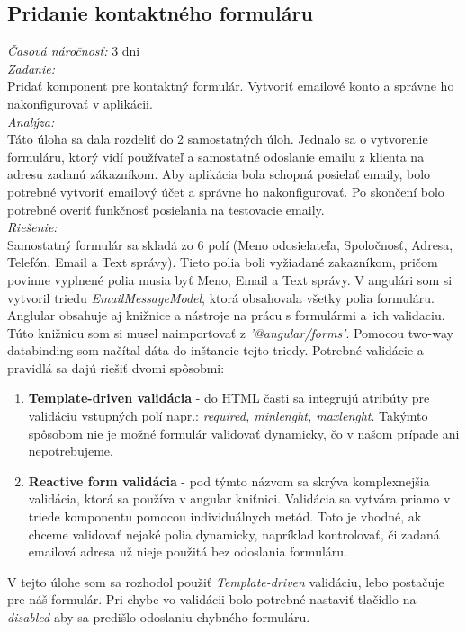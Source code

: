 \documentclass[11pt, oneside]{report}
\begin{document}
\subsection{Pridanie kontaktného formuláru }
\textit{Časová náročnosť:} 3 dni\\
\textit{Zadanie:}\\
Pridať komponent pre kontaktný formulár. Vytvoriť emailové konto a správne ho nakonfigurovať v aplikácii.
\\\textit{Analýza:}\\
Táto úloha sa dala rozdeliť do 2 samostatných úloh. Jednalo sa o vytvorenie formuláru, ktorý vidí používateľ a samostatné odoslanie emailu z klienta na adresu zadanú zákazníkom. Aby aplikácia bola schopná posielať emaily, bolo potrebné vytvoriť emailový účet a správne ho nakonfigurovať. Po skončení bolo potrebné overiť funkčnosť posielania na testovacie emaily.
\\\textit{Riešenie:}\\
Samostatný formulár sa skladá zo 6 polí (Meno odosielateľa, Spoločnosť, Adresa, Telefón, Email a Text správy). Tieto polia boli vyžiadané zakazníkom, pričom povinne vyplnené polia musia byť Meno, Email a Text správy. V angulári som si vytvoril triedu \textit{EmailMessageModel}, ktorá obsahovala všetky polia formuláru. Anglular obsahuje aj knižnice a nástroje na prácu s formulármi a~ich validaciu. Túto knižnicu som si musel naimportovať z  \textit{'@angular/forms'}. Pomocou two-way databinding som načítal dáta  do inštancie tejto triedy. Potrebné validácie a pravidlá sa dajú riešiť dvomi spôsobmi:
\begin{enumerate}
\item\textbf{Template-driven validácia} - do HTML časti  sa integrujú  atribúty pre validáciu vstupných polí napr.: \textit{required, minlenght, maxlenght}. Takýmto spôsobom nie je možné formulár validovať dynamicky, čo v našom prípade ani nepotrebujeme,
\item\textbf{Reactive form validácia} - pod týmto názvom sa skrýva komplexnejšia  validácia, ktorá sa používa v angular kniťnici. Validácia sa vytvára priamo v triede komponentu pomocou individuálnych metód. Toto je vhodné, ak chceme validovať nejaké polia dynamicky, napríklad kontrolovať, či  zadaná emailová adresa  už nieje použitá bez odoslania formuláru.

\end{enumerate}
 V tejto úlohe som sa rozhodol použiť \textit{Template-driven} validáciu, lebo postačuje pre náš  formulár. Pri chybe vo validácii   bolo potrebné nastaviť tlačidlo na \textit{disabled} aby sa predišlo odoslaniu chybného formuláru. 
\end{document}
